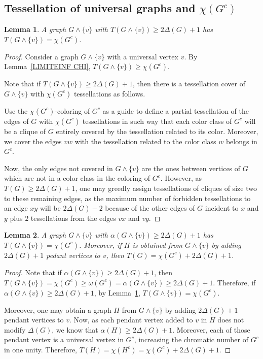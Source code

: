 \documentclass[9pt]{entcs} \usepackage{entcsmacro}
\newtheorem{lema}{Lemma}[section]
\begin{document}
\subsection{Tessellation of universal graphs and $\chi(G^c)$}
\label{sub:24}


\begin{lema}
\label{lema:chiGc}
A graph $G \land \{v\}$ with $T(G\land\{v\}) \geq 2\Delta(G)+1$ has $T(G\land\{v\}) = \chi(G^c)$.
\end{lema}
\begin{proof}
Consider a graph $G\land\{v\}$ with a universal vertex $v$.
By Lemma~\ref{LIMITEINF CHI}, $T(G\land\{v\}) \geq \chi(G^c)$.

Note that if $T(G\land\{v\}) \geq 2\Delta(G)+1$, then there is a tessellation cover of $G\land\{v\}$ with $\chi(G^c)$ tessellations as follows.

Use the $\chi(G^c)$-coloring of $G^c$ as a guide to define a partial tessellation of the edges of $G$ with $\chi(G^c)$ tessellations in such way that each color class of $G^c$ will be a clique of $G$ entirely covered by the tessellation related to its color. 
Moreover, we cover the edges $vw$ with the tessellation related to the color class $w$ belongs in $G^c$.

Now, the only edges not covered in $G\land\{v\}$ are the ones between vertices of $G$ which are not in a color class in the coloring of $G^c$.
However, as $T(G) \geq 2\Delta(G)+1$, one may greedly assign  tessellations of cliques of size two to these remaining edges, as the maximum number of forbidden tessellations to an edge $xy$ will be $2\Delta(G)-2$ because of the other edges of $G$ incident to $x$ and $y$ plus $2$ tessellations from the edges $vx$ and $vy$.
\end{proof}

\begin{lema}
\label{cor:chigc}
A graph $G \land \{v\}$ with $\alpha(G\land\{v\}) \geq 2\Delta(G)+1$ has $T(G\land\{v\}) =  \chi(G^c)$. Moreover, if $H$ is obtained from $G\land\{v\}$ by adding $2\Delta(G)+1$ pedant vertices to $v$, then $T(G) = \chi(G^c) + 2\Delta(G)+1$.
\end{lema}
\begin{proof}
Note that if $\alpha(G\land\{v\}) \geq 2\Delta(G)+1$, then $T(G\land\{v\}) =  \chi(G^c) \geq \omega(G^c) = \alpha(G \land \{v\}) \geq 2\Delta(G)+1$.
Therefore, if $\alpha(G\land\{v\}) \geq 2\Delta(G)+1$, by Lemma~\ref{lema:chiGc}, $T(G\land\{v\}) = \chi(G^c)$.

Moreover, one may obtain a graph $H$ from $G \land \{v\}$ by adding $2\Delta(G)+1$ pendant vertices to $v$. 
Now, as each pendant vertex added to $v$ in $H$ does not modify $\Delta(G)$, we know that $\alpha(H)\geq 2\Delta(G)+1$.
Moreover, each of those pendant vertex is a universal vertex in $G^c$, increasing the chromatic number of $G^c$ in one unity.
Therefore, $T(H) = \chi(H^c) = \chi(G^c) + 2\Delta(G)+1$.
\end{proof}
\end{document}
